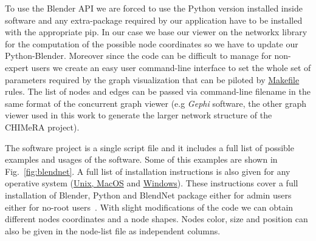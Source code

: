\documentclass{standalone}
\begin{document}
To use the Blender API we are forced to use the Python version installed inside software and any extra-package required by our application have to be installed with the appropriate \textsf{pip}.
In our case we base our viewer on the \textsf{networkx} library for the computation of the possible node coordinates so we have to update our Python-Blender.
Moreover since the code can be difficult to manage for non-expert users we create an easy user command-line interface to set the whole set of parameters required by the graph visualization that can be piloted by \href{https://github.com/Nico-Curti/BlendNet/blob/master/Makefile}{\textsf{Makefile}} rules.
The list of nodes and edges can be passed via command-line filename in the same format of the concurrent graph viewer (e.g \emph{Gephi} software, the other graph viewer used in this work to generate the larger network structure of the CHIMeRA project).

The software project is a single script file and it includes a full list of possible examples and usages of the software.
Some of this examples are shown in Fig.~\ref{fig:blendnet}.
A full list of installation instructions is also given for any operative system (\href{https://github.com/Nico-Curti/BlendNet/blob/master/install.sh}{Unix, MacOS} and \href{https://github.com/Nico-Curti/BlendNet/blob/master/install.ps1}{Windows}).
These instructions cover a full installation of Blender, Python and BlendNet package either for admin users either for no-root users~\cite{Shut}.
With slight modifications of the code we can obtain different nodes coordinates and a node shapes.
Nodes color, size and position can also be given in the node-list file as independent columns.
\end{document}
